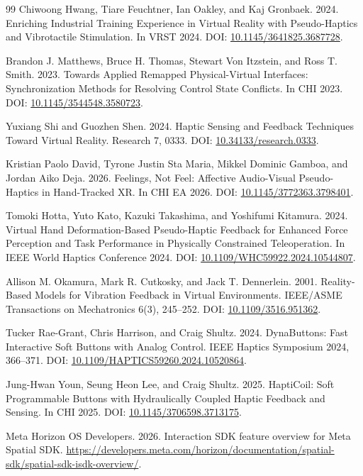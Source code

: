 \documentclass[11pt]{article}
\begin{document}
\begin{thebibliography}{99}
Chiwoong Hwang, Tiare Feuchtner, Ian Oakley, and Kaj Gronbaek. 2024. Enriching Industrial Training Experience in Virtual Reality with Pseudo-Haptics and Vibrotactile Stimulation. In VRST 2024. DOI: \href{https://doi.org/10.1145/3641825.3687728}{10.1145/3641825.3687728}.

Brandon J. Matthews, Bruce H. Thomas, Stewart Von Itzstein, and Ross T. Smith. 2023. Towards Applied Remapped Physical-Virtual Interfaces: Synchronization Methods for Resolving Control State Conflicts. In CHI 2023. DOI: \href{https://doi.org/10.1145/3544548.3580723}{10.1145/3544548.3580723}.

Yuxiang Shi and Guozhen Shen. 2024. Haptic Sensing and Feedback Techniques Toward Virtual Reality. Research 7, 0333. DOI: \href{https://doi.org/10.34133/research.0333}{10.34133/research.0333}.

Kristian Paolo David, Tyrone Justin Sta Maria, Mikkel Dominic Gamboa, and Jordan Aiko Deja. 2026. Feelings, Not Feel: Affective Audio-Visual Pseudo-Haptics in Hand-Tracked XR. In CHI EA 2026. DOI: \href{https://doi.org/10.1145/3772363.3798401}{10.1145/3772363.3798401}.

Tomoki Hotta, Yuto Kato, Kazuki Takashima, and Yoshifumi Kitamura. 2024. Virtual Hand Deformation-Based Pseudo-Haptic Feedback for Enhanced Force Perception and Task Performance in Physically Constrained Teleoperation. In IEEE World Haptics Conference 2024. DOI: \href{https://doi.org/10.1109/WHC59922.2024.10544807}{10.1109/WHC59922.2024.10544807}.

Allison M. Okamura, Mark R. Cutkosky, and Jack T. Dennerlein. 2001. Reality-Based Models for Vibration Feedback in Virtual Environments. IEEE/ASME Transactions on Mechatronics 6(3), 245--252. DOI: \href{https://doi.org/10.1109/3516.951362}{10.1109/3516.951362}.

Tucker Rae-Grant, Chris Harrison, and Craig Shultz. 2024. DynaButtons: Fast Interactive Soft Buttons with Analog Control. IEEE Haptics Symposium 2024, 366--371. DOI: \href{https://doi.org/10.1109/HAPTICS59260.2024.10520864}{10.1109/HAPTICS59260.2024.10520864}.

Jung-Hwan Youn, Seung Heon Lee, and Craig Shultz. 2025. HaptiCoil: Soft Programmable Buttons with Hydraulically Coupled Haptic Feedback and Sensing. In CHI 2025. DOI: \href{https://doi.org/10.1145/3706598.3713175}{10.1145/3706598.3713175}.

Meta Horizon OS Developers. 2026. Interaction SDK feature overview for Meta Spatial SDK. \url{https://developers.meta.com/horizon/documentation/spatial-sdk/spatial-sdk-isdk-overview/}.
\end{thebibliography}
\end{document}
